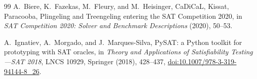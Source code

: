 \documentclass[10pt]{article}
\theoremstyle{definition}
\theoremstyle{remark}
\begin{document}
\begin{thebibliography}{99}
A.~Biere, K.~Fazekas, M.~Fleury, and M.~Heisinger,
\newblock CaDiCaL, Kissat, Paracooba, Plingeling and Treengeling entering the
SAT Competition 2020,
\newblock in \emph{SAT Competition 2020: Solver and Benchmark Descriptions}
(2020), 50--53.

A.~Ignatiev, A.~Morgado, and J.~Marques-Silva,
\newblock PySAT: a Python toolkit for prototyping with SAT oracles,
\newblock in \emph{Theory and Applications of Satisfiability Testing---SAT
2018}, LNCS 10929, Springer (2018), 428--437,
\newblock \href{https://doi.org/10.1007/978-3-319-94144-8_26}{doi:10.1007/978-3-319-94144-8\_26}.

\end{thebibliography}
\end{document}
